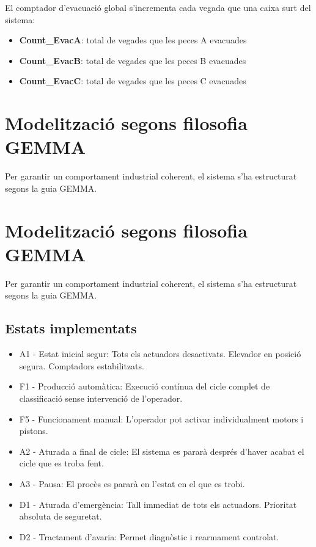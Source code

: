 \documentclass[12pt,a4paper]{report}
\begin{document}
El comptador d'evacuació global s'incrementa cada vegada que una caixa surt del sistema:

\begin{itemize}
\item \textbf{Count\_EvacA}: total de vegades que les peces A evacuades
\item \textbf{Count\_EvacB}: total de vegades que les peces B evacuades
\item \textbf{Count\_EvacC}: total de vegades que les peces C evacuades
\end{itemize}

\section{Modelització segons filosofia GEMMA}

Per garantir un comportament industrial coherent, el sistema s'ha estructurat segons la guia GEMMA.


\section{Modelització segons filosofia GEMMA}

Per garantir un comportament industrial coherent, el sistema s'ha estructurat segons la guia GEMMA.

\subsection{Estats implementats}

\begin{itemize}
\item A1 - Estat inicial segur: Tots els actuadors desactivats. Elevador en posició segura. Comptadors estabilitzats.

\item F1 - Producció automàtica: Execució contínua del cicle complet de classificació sense intervenció de l'operador.

\item F5 - Funcionament manual: L'operador pot activar individualment motors i pistons.

\item A2 - Aturada a final de cicle: El sistema es pararà després d'haver acabat el cicle que es troba fent.
\item A3 - Pausa: El procès es pararà en l'estat en el que es trobi.
\item D1 - Aturada d'emergència: Tall immediat de tots els actuadors. Prioritat absoluta de seguretat.

\item D2 - Tractament d'avaria: Permet diagnòstic i rearmament controlat.
\end{itemize}
\end{document}
